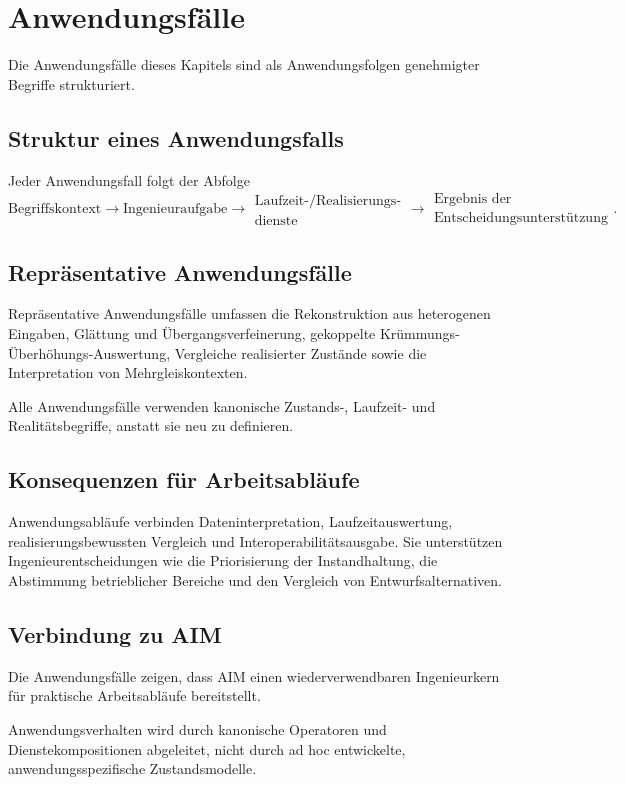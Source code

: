 \chapter{Anwendungsfälle}
\label{chap:applications-use-cases}

Die Anwendungsfälle dieses Kapitels sind als Anwendungsfolgen genehmigter
Begriffe strukturiert.

\section{Struktur eines Anwendungsfalls}

Jeder Anwendungsfall folgt der Abfolge
\[
\text{Begriffskontext}
\rightarrow
\text{Ingenieuraufgabe}
\rightarrow
\substack{\text{Laufzeit-/Realisierungs-}\\\text{dienste}}
\rightarrow
\substack{\text{Ergebnis der}\\\text{Entscheidungsunterstützung}}.
\]

\section{Repräsentative Anwendungsfälle}

Repräsentative Anwendungsfälle umfassen die Rekonstruktion aus
heterogenen Eingaben, Glättung und Übergangsverfeinerung, gekoppelte
Krümmungs-Überhöhungs-Auswertung, Vergleiche realisierter Zustände sowie
die Interpretation von Mehrgleiskontexten.

Alle Anwendungsfälle verwenden kanonische Zustands-, Laufzeit- und
Realitätsbegriffe, anstatt sie neu zu definieren.

\section{Konsequenzen für Arbeitsabläufe}

Anwendungsabläufe verbinden Dateninterpretation, Laufzeitauswertung,
realisierungsbewussten Vergleich und Interoperabilitätsausgabe. Sie
unterstützen Ingenieurentscheidungen wie die Priorisierung der
Instandhaltung, die Abstimmung betrieblicher Bereiche und den Vergleich
von Entwurfsalternativen.

\section{Verbindung zu AIM}
\begin{summary}
Die Anwendungsfälle zeigen, dass AIM einen wiederverwendbaren
Ingenieurkern für praktische Arbeitsabläufe bereitstellt.

Anwendungsverhalten wird durch kanonische Operatoren und
Dienstekompositionen abgeleitet, nicht durch ad hoc entwickelte,
anwendungsspezifische Zustandsmodelle.
\end{summary}
